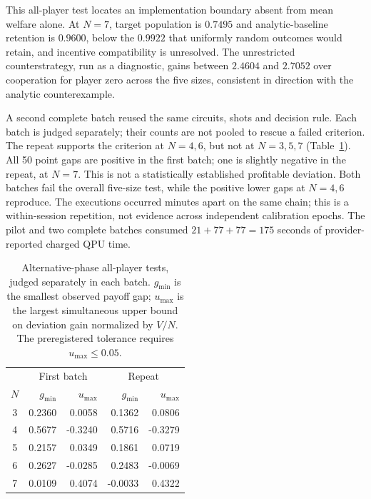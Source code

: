 This all-player test locates an implementation boundary absent from mean
welfare alone. At $N=7$, target population is $0.7495$ and analytic-baseline
retention is $0.9600$, below the $0.9922$ that uniformly random outcomes
would retain, and incentive compatibility is unresolved. The unrestricted
counterstrategy, run as a diagnostic, gains between $2.4604$ and $2.7052$
over cooperation for player zero across the five sizes, consistent in
direction with the analytic counterexample.

A second complete batch reused the same circuits, shots and decision rule. Each batch is judged separately;
their counts are not pooled to rescue a failed criterion. The repeat
supports the criterion at $N=4,6$, but not at $N=3,5,7$
(Table~\ref{tab:phase-repeat}). All 50 point gaps are positive in the first
batch; one is slightly negative in the repeat, at $N=7$. This is not a
statistically established profitable deviation. Both batches fail the
overall five-size test, while the positive lower gaps at $N=4,6$ reproduce.
The executions occurred minutes apart on the same chain; this is a
within-session repetition, not evidence across independent calibration
epochs. The pilot and two complete batches consumed $21+77+77=175$ seconds
of provider-reported charged QPU time.

\begin{table}[t]
\centering
\caption{Alternative-phase all-player tests, judged separately in each
batch. $g_{\min}$ is the smallest observed payoff gap; $u_{\max}$ is the
largest simultaneous upper bound on deviation gain normalized by $V/N$.
The preregistered tolerance requires $u_{\max}\le0.05$.}
\label{tab:phase-repeat}
\begin{tabular}{crrrr}
\toprule
& \multicolumn{2}{c}{First batch} & \multicolumn{2}{c}{Repeat}\\
$N$ & $g_{\min}$ & $u_{\max}$ & $g_{\min}$ & $u_{\max}$\\
\midrule
3 & 0.2360 & 0.0058 & 0.1362 & 0.0806\\
4 & 0.5677 & -0.3240 & 0.5716 & -0.3279\\
5 & 0.2157 & 0.0349 & 0.1861 & 0.0719\\
6 & 0.2627 & -0.0285 & 0.2483 & -0.0069\\
7 & 0.0109 & 0.4074 & -0.0033 & 0.4322\\
\bottomrule
\end{tabular}
\end{table}
